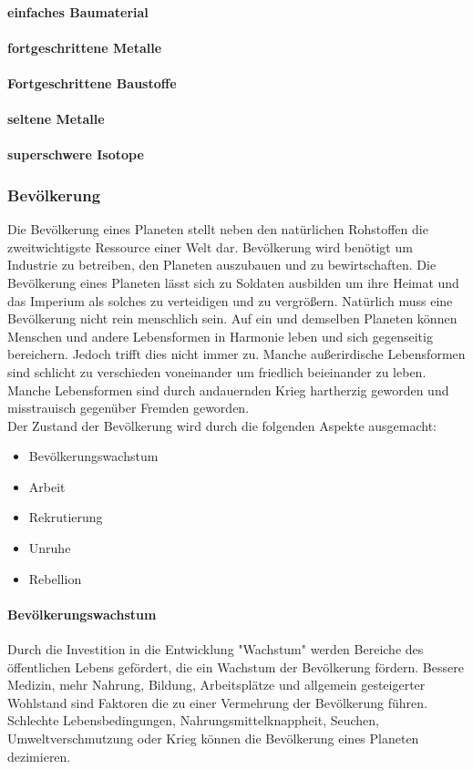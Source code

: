 \documentclass[11pt, a4paper]{article}
\begin{document}
\paragraph{einfaches Baumaterial}
%
\paragraph{fortgeschrittene Metalle}
%
\paragraph{Fortgeschrittene Baustoffe}
%
\paragraph{seltene Metalle}
%
\paragraph{superschwere Isotope}
%
\subsubsection{Bevölkerung}
Die Bevölkerung eines Planeten stellt neben den natürlichen Rohstoffen die zweitwichtigste Ressource einer Welt
dar. Bevölkerung wird benötigt um Industrie zu betreiben, den Planeten auszubauen und zu bewirtschaften.
Die Bevölkerung eines Planeten lässt sich zu Soldaten ausbilden um ihre Heimat und das Imperium als solches
zu verteidigen und zu vergrößern. Natürlich muss eine Bevölkerung nicht rein menschlich sein. Auf ein und
demselben Planeten können Menschen und andere Lebensformen in Harmonie leben und sich gegenseitig bereichern.
Jedoch trifft dies nicht immer zu. Manche außerirdische Lebensformen sind schlicht zu verschieden voneinander
um friedlich beieinander zu leben. Manche Lebensformen sind durch andauernden Krieg hartherzig geworden und
misstrauisch gegenüber Fremden geworden.\\
Der Zustand der Bevölkerung wird durch die folgenden Aspekte ausgemacht:
\begin{itemize}
	\item Bevölkerungswachstum
	\item Arbeit
	\item Rekrutierung
	\item Unruhe
	\item Rebellion
\end{itemize}
%
\paragraph{Bevölkerungswachstum}
Durch die Investition in die Entwicklung "Wachstum" werden Bereiche des öffentlichen Lebens gefördert, die
ein Wachstum der Bevölkerung fördern. Bessere Medizin, mehr Nahrung, Bildung, Arbeitsplätze und allgemein
gesteigerter Wohlstand sind Faktoren die zu einer Vermehrung der Bevölkerung führen.
Schlechte Lebensbedingungen, Nahrungsmittelknappheit, Seuchen, Umweltverschmutzung oder Krieg können die
Bevölkerung eines Planeten dezimieren.
%
\end{document}
